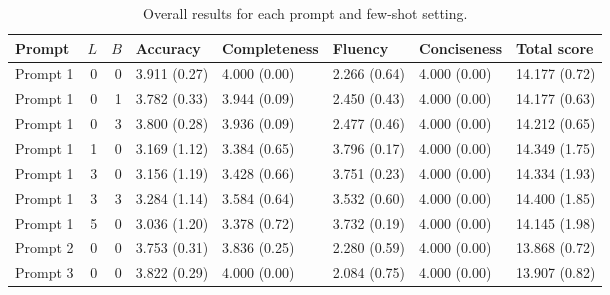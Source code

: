 \begin{table}
\caption{Overall results for each prompt and few-shot setting.}
\begin{tabular}{lrrlllll}
\toprule
Prompt & $L$ & $B$ & Accuracy & Completeness & Fluency & Conciseness & Total score \\
\midrule
Prompt 1 & 0 & 0 & 3.911 (0.27) & 4.000 (0.00) & 2.266 (0.64) & 4.000 (0.00) & 14.177 (0.72) \\
Prompt 1 & 0 & 1 & 3.782 (0.33) & 3.944 (0.09) & 2.450 (0.43) & 4.000 (0.00) & 14.177 (0.63) \\
Prompt 1 & 0 & 3 & 3.800 (0.28) & 3.936 (0.09) & 2.477 (0.46) & 4.000 (0.00) & 14.212 (0.65) \\
Prompt 1 & 1 & 0 & 3.169 (1.12) & 3.384 (0.65) & 3.796 (0.17) & 4.000 (0.00) & 14.349 (1.75) \\
Prompt 1 & 3 & 0 & 3.156 (1.19) & 3.428 (0.66) & 3.751 (0.23) & 4.000 (0.00) & 14.334 (1.93) \\
Prompt 1 & 3 & 3 & 3.284 (1.14) & 3.584 (0.64) & 3.532 (0.60) & 4.000 (0.00) & 14.400 (1.85) \\
Prompt 1 & 5 & 0 & 3.036 (1.20) & 3.378 (0.72) & 3.732 (0.19) & 4.000 (0.00) & 14.145 (1.98) \\
Prompt 2 & 0 & 0 & 3.753 (0.31) & 3.836 (0.25) & 2.280 (0.59) & 4.000 (0.00) & 13.868 (0.72) \\
Prompt 3 & 0 & 0 & 3.822 (0.29) & 4.000 (0.00) & 2.084 (0.75) & 4.000 (0.00) & 13.907 (0.82) \\
\bottomrule
\end{tabular}
\end{table}
